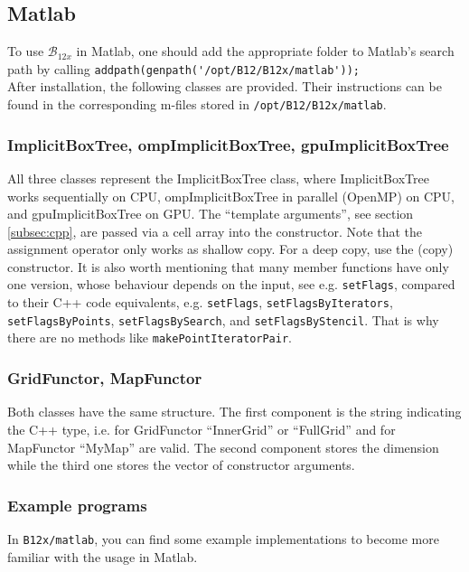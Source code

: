 \documentclass[a4paper,10pt,fleqn]{article}
\newcommand{\BTwelveVersion}[1]{\mathcal{B}_{12#1}}
\begin{document}
\subsection{Matlab}

To use $\BTwelveVersion{x}$ in Matlab, one should add the appropriate folder to Matlab's search path by calling \verb$addpath(genpath('/opt/B12/B12x/matlab'));$\\
After installation, the following classes are provided. Their instructions can be found in the corresponding m-files stored in \verb$/opt/B12/B12x/matlab$.

\subsubsection*{ImplicitBoxTree, ompImplicitBoxTree, gpuImplicitBoxTree}

All three classes represent the ImplicitBoxTree class, where ImplicitBoxTree works sequentially on CPU, ompImplicitBoxTree in parallel (OpenMP) on CPU, and gpuImplicitBoxTree on GPU. The ``template arguments'', see section \ref{subsec:cpp}, are passed via a cell array into the constructor. Note that the assignment operator only works as shallow copy. For a deep copy, use the (copy) constructor. It is also worth mentioning that many member functions have only one version, whose behaviour depends on the input, see e.g. \verb$setFlags$, compared to their C++ code equivalents, e.g. \verb$setFlags$, \verb$setFlagsByIterators$, \verb$setFlagsByPoints$, \verb$setFlagsBySearch$, and \verb$setFlagsByStencil$. That is why there are no methods like \verb$makePointIteratorPair$.

\subsubsection*{GridFunctor, MapFunctor}

Both classes have the same structure. The first component is the string indicating the C++ type, i.e. for GridFunctor ``InnerGrid'' or ``FullGrid'' and for MapFunctor ``MyMap'' are valid. The second component stores the dimension while the third one stores the vector of constructor arguments.

\subsubsection*{Example programs}

In \verb$B12x/matlab$, you can find some example implementations to become more familiar with the usage in Matlab.
\end{document}
